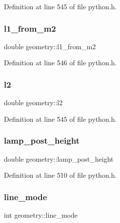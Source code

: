 Definition at line 545 of file python.\+h.

\mbox{\label{structgeometry_a793323d09b89fa535b821aee15494ca7}} 
\subsubsection{\texorpdfstring{l1\+\_\+from\+\_\+m2}{l1\_from\_m2}}
{\footnotesize\ttfamily double geometry\+::l1\+\_\+from\+\_\+m2}



Definition at line 546 of file python.\+h.

\mbox{\label{structgeometry_a035ef7689d6002d513ed566a916359e2}} 
\subsubsection{\texorpdfstring{l2}{l2}}
{\footnotesize\ttfamily double geometry\+::l2}



Definition at line 545 of file python.\+h.

\mbox{\label{structgeometry_a84953aedf654c1f29c00429e166a6629}} 
\subsubsection{\texorpdfstring{lamp\+\_\+post\+\_\+height}{lamp\_post\_height}}
{\footnotesize\ttfamily double geometry\+::lamp\+\_\+post\+\_\+height}



Definition at line 510 of file python.\+h.

\mbox{\label{structgeometry_a723a95d320445157000eca0048dde821}} 
\subsubsection{\texorpdfstring{line\+\_\+mode}{line\_mode}}
{\footnotesize\ttfamily int geometry\+::line\+\_\+mode}




